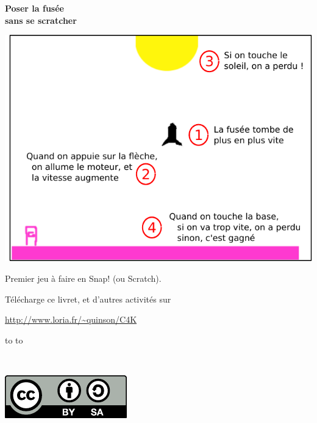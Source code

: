 \documentclass[a7paper,pagesize,DIV=14,10pt]{scrbook}
\newcommand{\snap}{Snap!\xspace}
\begin{document}
\begin{center}
  \textbf{{\huge Poser la fusée}\\
    \Large sans se scratcher}
\end{center}

\smallskip
\includegraphics[width=\textwidth]{img/fusee_but-du-jeu.pdf}

\medskip%
Premier jeu à faire en \snap{} (ou Scratch).
  
\vfill%
\begin{center}
\begin{spacing}{.8}
  \centerline{\footnotesize Télécharge ce livret, et d'autres activités sur}

  \centerline{\small\color{blue}\url{http://www.loria.fr/~quinson/C4K}}
\end{spacing}

\vspace{.2\baselineskip}
\begin{minipage}{.8\linewidth}
  \begin{spacing}{.5}
    \hbox to \linewidth{\tiny~\hfill Vous pouvez copier, modifier et diffuser librement ce document,}
    \hbox to \linewidth{\tiny~\hfill à la seule condition de laisser ces mêmes droits à vos lecteurs.}
  \end{spacing}
\end{minipage}%
~
\begin{minipage}[b]{.16\linewidth}
  \includegraphics[width=\linewidth]{img/logo_by-sa.pdf}
\end{minipage}%
\end{center}
\end{document}
